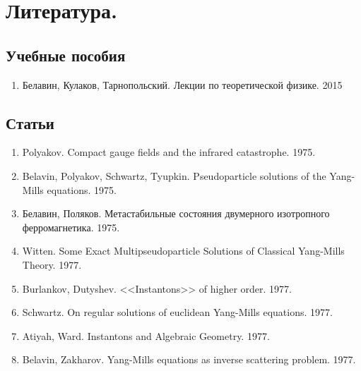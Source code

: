 \documentclass[12pt]{article}
\theoremstyle{definition}
\begin{document}
\section{Литература.}
\subsection*{Учебные пособия}
\begin{enumerate}
    \item Белавин, Кулаков, Тарнопольский. Лекции по теоретической физике. 2015
\end{enumerate}
\subsection*{Статьи}
\begin{enumerate}
    \item Polyakov. Compact gauge fields and the infrared catastrophe. 1975.
    \item Belavin, Polyakov, Schwartz, Tyupkin. Pseudoparticle solutions of the Yang-Mills equations. 1975.
    \item Белавин, Поляков. Метастабильные состояния двумерного изотропного ферромагнетика. 1975.
    \item Witten. Some Exact Multipseudoparticle Solutions of Classical Yang-Mills Theory. 1977.
    \item Burlankov, Dutyshev. <<Instantons>> of higher order. 1977.
    \item Schwartz. On regular solutions of euclidean Yang-Mills equations. 1977.
    \item Atiyah, Ward. Instantons and Algebraic Geometry. 1977.
    \item Belavin, Zakharov. Yang-Mills equations as inverse scattering problem. 1977.
    
\end{enumerate}
\end{document}
